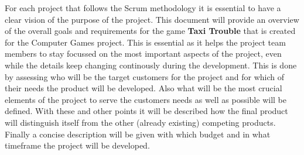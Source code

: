 For each project that follows the Scrum methodology it is essential to have a clear vision of the purpose of the project. This document will provide an overview of the overall goals and requirements for the game \textbf{Taxi Trouble} that is created for the Computer Games project. This is essential as it helps the project team members to stay focussed on the most important aspects of the project, even while the details keep changing continously during the development. This is done by assessing who will be the target customers for the project and for which of their needs the product will be developed. Also what will be the most crucial elements of the project to serve the customers needs as well as possible will be defined. With these and other points it will be described how the final product will distinguish itself from the other (already existing) competing products. Finally a concise description will be given with which budget and in what timeframe the project will be developed.



